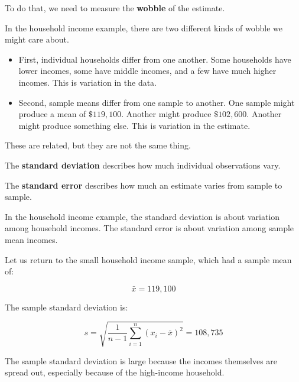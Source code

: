 \documentclass[
  letterpaper,
  DIV=11,
  numbers=noendperiod]{scrreprt}
\providecommand{\tightlist}{%
  \setlength{\itemsep}{0pt}\setlength{\parskip}{0pt}}
\begin{document}
To do that, we need to measure the \textbf{wobble} of the estimate.

In the household income example, there are two different kinds of wobble
we might care about.

\begin{itemize}
\tightlist
\item
  First, individual households differ from one another. Some households
  have lower incomes, some have middle incomes, and a few have much
  higher incomes. This is variation in the data.
\item
  Second, sample means differ from one sample to another. One sample
  might produce a mean of \(\$119{,}100\). Another might produce
  \(\$102{,}600\). Another might produce something else. This is
  variation in the estimate.
\end{itemize}

These are related, but they are not the same thing.

\begin{tcolorbox}[enhanced jigsaw, arc=.35mm, bottomrule=.15mm, bottomtitle=1mm, breakable, colback=white, colbacktitle=quarto-callout-important-color!10!white, colframe=quarto-callout-important-color-frame, coltitle=black, left=2mm, leftrule=.75mm, opacityback=0, opacitybacktitle=0.6, rightrule=.15mm, title=\textcolor{quarto-callout-important-color}{\faExclamation}\hspace{0.5em}{Do not confuse these two quantities}, titlerule=0mm, toprule=.15mm, toptitle=1mm]

The \textbf{standard deviation} describes how much individual
observations vary.

The \textbf{standard error} describes how much an estimate varies from
sample to sample.

In the household income example, the standard deviation is about
variation among household incomes. The standard error is about variation
among sample mean incomes.

\end{tcolorbox}

Let us return to the small household income sample, which had a sample
mean of:

\[
\bar{x} = 119{,}100
\]

The sample standard deviation is:

\[
s
=
\sqrt{
\frac{1}{n-1}
\sum_{i=1}^{n}
(x_i - \bar{x})^2
}
=108{,}735
\]

The sample standard deviation is large because the incomes themselves
are spread out, especially because of the high-income household.
\end{document}
